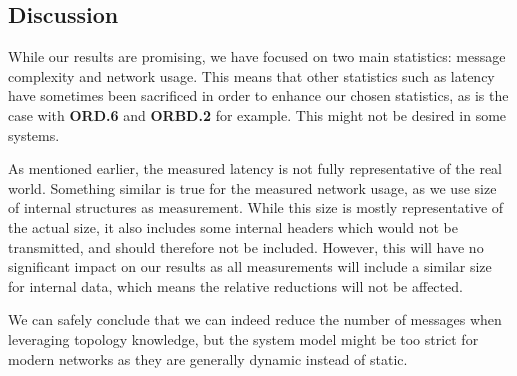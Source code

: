 \subsection{Discussion}

While our results are promising, we have focused on two main statistics: message complexity and network usage. This means that other statistics such as latency have sometimes been sacrificed in order to enhance our chosen statistics, as is the case with \textbf{ORD.6} and \textbf{ORBD.2} for example. This might not be desired in some systems.

As mentioned earlier, the measured latency is not fully representative of the real world. Something similar is true for the measured network usage, as we use size of internal structures as measurement. While this size is mostly representative of the actual size, it also includes some internal headers which would not be transmitted, and should therefore not be included. However, this will have no significant impact on our results as all measurements will include a similar size for internal data, which means the relative reductions will not be affected.

We can safely conclude that we can indeed reduce the number of messages when leveraging topology knowledge, but the system model might be too strict for modern networks as they are generally dynamic instead of static. 